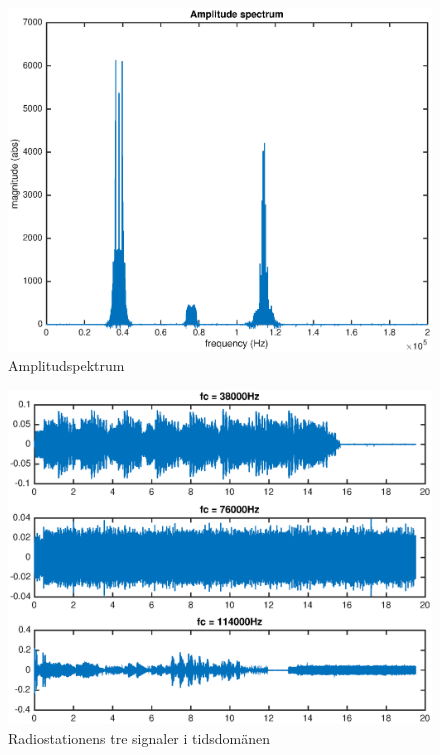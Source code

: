 \documentclass[10pt]{article}
\begin{document}
\clearpage

\begin{figure}
  \centering
  \includegraphics[scale=0.55]{figurer/amplitudspektrum.eps}
  \caption{Amplitudspektrum}
  \label{amplitudspektrum}
\end{figure}

\begin{figure}
  \centering
  \includegraphics[scale=0.55]{figurer/signaler.eps}
  \caption{Radiostationens tre signaler i tidsdomänen}
  \label{signaler}
\end{figure}
\end{document}
